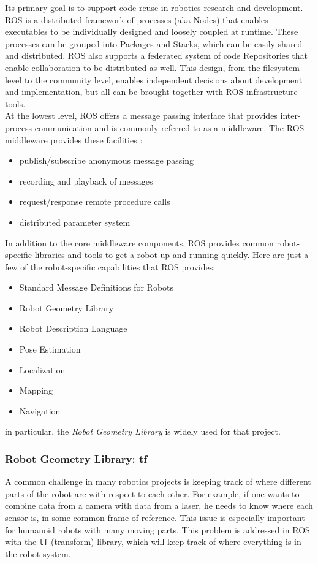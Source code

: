 Its primary goal is to support code reuse in robotics research and development. \ac{ROS} is a distributed framework of processes (aka Nodes) that enables executables to be individually designed and loosely coupled at runtime. These processes can be grouped into Packages and Stacks, which can be easily shared and distributed. \ac{ROS} also supports a federated system of code Repositories that enable collaboration to be distributed as well. This design, from the filesystem level to the community level, enables independent decisions about development and implementation, but all can be brought together with \ac{ROS} infrastructure tools.\\
At the lowest level, ROS offers a message passing interface that provides inter-process communication and is commonly referred to as a middleware.
The ROS middleware provides these facilities \cite{ros:core-components}:
\begin{itemize}
    \item publish/subscribe anonymous message passing
    \item recording and playback of messages
    \item request/response remote procedure calls
    \item distributed parameter system
\end{itemize}
In addition to the core middleware components, ROS provides common robot-specific libraries and tools to get a robot up and running quickly. Here are just a few of the robot-specific capabilities that ROS provides:
\begin{itemize}
    \item Standard Message Definitions for Robots
    \item Robot Geometry Library
    \item Robot Description Language
    \item Pose Estimation
    \item Localization
    \item Mapping
    \item Navigation
\end{itemize}
in particular, the \emph{Robot Geometry Library} is widely used for that project.
\subsubsection*{Robot Geometry Library: tf}
A common challenge in many robotics projects is keeping track of where different parts of the robot are with respect to each other. For example, if one wants to combine data from a camera with data from a laser, he needs to know where each sensor is, in some common frame of reference. This issue is especially important for humanoid robots with many moving parts. This problem is addressed in ROS with the \texttt{tf} (transform) library, which will keep track of where everything is in the robot system.

